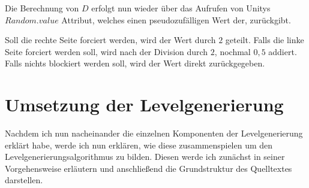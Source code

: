 Die Berechnung von $D$ erfolgt nun wieder über das Aufrufen von Unitys $Random.value$ Attribut, welches einen pseudozufälligen Wert der, zurückgibt.

Soll die rechte Seite forciert werden, wird der Wert durch $2$ geteilt. Falls die linke Seite forciert werden soll, wird nach der Division durch $2$, nochmal $0,5$ addiert. Falls nichts blockiert werden soll, wird der Wert direkt zurückgegeben.

\section{Umsetzung der Levelgenerierung}

Nachdem ich nun nacheinander die einzelnen Komponenten der Levelgenerierung erklärt habe, werde ich nun erklären, wie diese zusammenspielen um den Levelgenerierungsalgorithmus zu bilden. Diesen werde ich zunächst in seiner Vorgehensweise erläutern und anschließend die Grundstruktur des Quelltextes darstellen.

